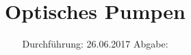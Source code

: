 

\subject{V21}
\title{Optisches Pumpen}
\date{
  Durchführung: 26.06.2017
  \hspace{3em}
  Abgabe: 
}



\maketitle
\thispagestyle{empty}
\tableofcontents
\newpage







\printbibliography


